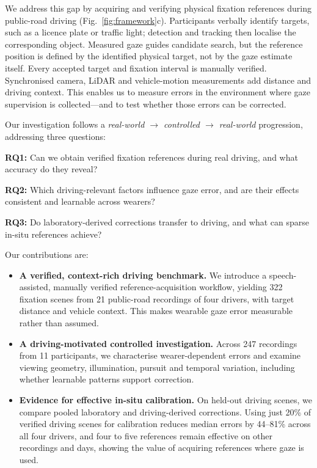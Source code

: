 We address this gap by acquiring and verifying physical fixation references during public-road driving (Fig.~\ref{fig:framework}c). Participants verbally identify targets, such as a licence plate or traffic light; detection and tracking then localise the corresponding object. Measured gaze guides candidate search, but the reference position is defined by the identified physical target, not by the gaze estimate itself. Every accepted target and fixation interval is manually verified. Synchronised camera, LiDAR and vehicle-motion measurements add distance and driving context. This enables us to measure errors in the environment where gaze supervision is collected---and to test whether those errors can be corrected.

Our investigation follows a \emph{real-world $\rightarrow$ controlled $\rightarrow$ real-world} progression, addressing three questions:

\noindent\textbf{RQ1:} Can we obtain verified fixation references during real driving, and what accuracy do they reveal?

\noindent\textbf{RQ2:} Which driving-relevant factors influence gaze error, and are their effects consistent and learnable across wearers?

\noindent\textbf{RQ3:} Do laboratory-derived corrections transfer to driving, and what can sparse in-situ references achieve?

Our contributions are:
\begin{itemize}[]
  \item[\textbf{C1}] \textbf{A verified, context-rich driving benchmark.} We introduce a speech-assisted, manually verified reference-acquisition workflow, yielding 322 fixation scenes from 21 public-road recordings of four drivers, with target distance and vehicle context. This makes wearable gaze error measurable rather than assumed.

  \item[\textbf{C2}] \textbf{A driving-motivated controlled investigation.} Across 247 recordings from 11 participants, we characterise wearer-dependent errors and examine viewing geometry, illumination, pursuit and temporal variation, including whether learnable patterns support correction.

  \item[\textbf{C3}] \textbf{Evidence for effective in-situ calibration.} On held-out driving scenes, we compare pooled laboratory and driving-derived corrections. Using just 20\% of verified driving scenes for calibration reduces median errors by 44--81\% across all four drivers, and four to five references remain effective on other recordings and days, showing the value of acquiring references where gaze is used.
\end{itemize}
